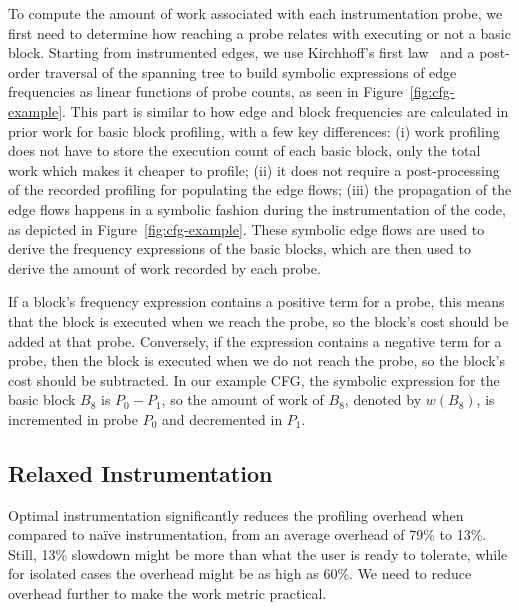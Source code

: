     To compute the amount of work associated with each instrumentation probe, we first need to determine how reaching a probe relates with
    executing or not a basic block. Starting from instrumented edges, we use Kirchhoff's first law~\cite{knuth73,ball94} and a post-order
    traversal of the spanning tree to build symbolic expressions of edge frequencies as linear functions of probe counts, as seen in
    Figure~\ref{fig:cfg-example}. This part is similar to how edge and block frequencies are calculated in prior work for basic block
    profiling, with a few key differences:
    (i)   work profiling does not have to store the execution count of each basic block, only the total work which makes it cheaper to profile;
    (ii)  it does not require a post-processing of the recorded profiling for populating the edge flows;
    (iii) the propagation of the edge flows happens in a symbolic fashion during the instrumentation of the code, as depicted in Figure~\ref{fig:cfg-example}.
    These symbolic edge flows are used to derive the frequency expressions of the basic blocks, which are then used to derive the amount of work
    recorded by each probe.


    If a block's frequency expression contains a positive term for a probe, this means that the block is executed when we reach the probe,
    so the block's cost should be added at that probe. Conversely, if the expression contains a negative term for a probe, then the block
    is executed when we do not reach the probe, so the block's cost should be subtracted. In our example CFG, the symbolic expression for
    the basic block $B_8$ is $P_0 - P_1$, so the amount of work of $B_8$, denoted by $w(B_8)$, is incremented in probe $P_0$ and
    decremented in $P_1$.


    \subsection{Relaxed Instrumentation}\label{subsec:relaxed}

    Optimal instrumentation significantly reduces the profiling overhead when compared to na\"ive instrumentation, from an average overhead
    of 79\% to 13\%. Still, 13\% slowdown might be more than what the user is ready to tolerate, while for isolated cases the overhead might
    be as high as 60\%. We need to reduce overhead further to make the work metric practical.

